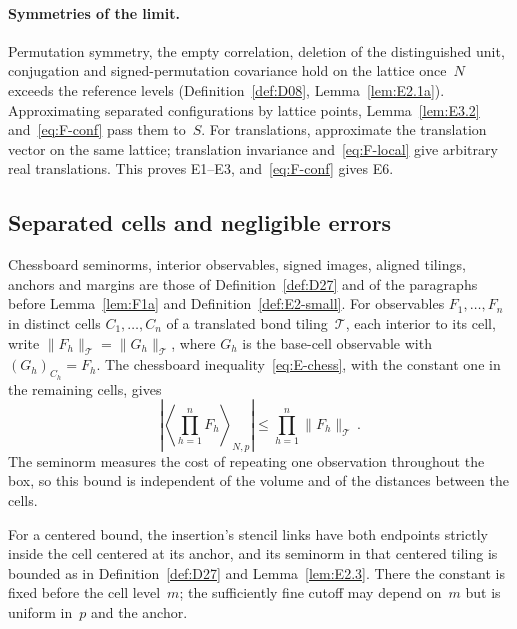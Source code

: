 \paragraph{Symmetries of the limit.} Permutation symmetry, the empty correlation, deletion of the distinguished unit, conjugation and signed-permutation covariance hold on the lattice once~$N$ exceeds the reference levels (Definition~\ref{def:D08}, Lemma~\ref{lem:E2.1a}). Approximating separated configurations by lattice points, Lemma~\ref{lem:E3.2} and~\eqref{eq:F-conf} pass them to~$S$. For translations, approximate the translation vector on the same lattice; translation invariance and~\eqref{eq:F-local} give arbitrary real translations. This proves E1--E3, and~\eqref{eq:F-conf} gives E6.

\subsection{Separated cells and negligible errors}\label{sec:partII-F.2}

Chessboard seminorms, interior observables, signed images, aligned tilings, anchors and margins are those of Definition~\ref{def:D27} and of the paragraphs before Lemma~\ref{lem:F1a} and Definition~\ref{def:E2-small}. For observables $F_1,\ldots,F_n$ in distinct cells $C_1,\ldots,C_n$ of a translated bond tiling~$\mathcal T$, each interior to its cell, write $\|F_h\|_{\mathcal T}=\|G_h\|_{\mathcal T}$, where $G_h$ is the base-cell observable with $(G_h)_{C_h}=F_h$. The chessboard inequality~\eqref{eq:E-chess}, with the constant one in the remaining cells, gives
\begin{equation}\label{eq:F-chess}
\left|\left\langle\prod_{h=1}^nF_h\right\rangle_{N,p}\right|
\le\prod_{h=1}^n\|F_h\|_{\mathcal T}\,.
\end{equation}
The seminorm measures the cost of repeating one observation throughout the box, so this bound is independent of the volume and of the distances between the cells.

For a centered bound, the insertion's stencil links have both endpoints strictly inside the cell centered at its anchor, and its seminorm in that centered tiling is bounded as in Definition~\ref{def:D27} and Lemma~\ref{lem:E2.3}. There the constant is fixed before the cell level~$m$; the sufficiently fine cutoff may depend on~$m$ but is uniform in~$p$ and the anchor.

